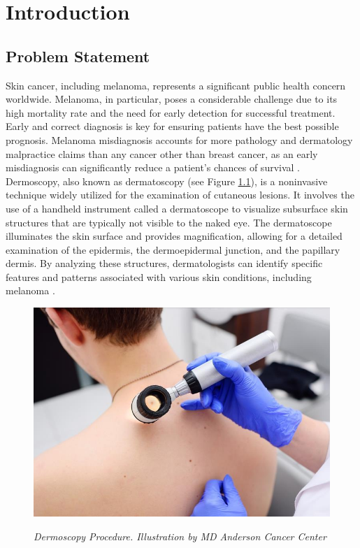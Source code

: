 \chapter{Introduction}
\label{cap:intro}

\section{Problem Statement}

Skin cancer, including melanoma, represents a significant public health concern
worldwide. Melanoma, in particular, poses a considerable challenge due to its
high mortality rate and the need for early detection for successful treatment.
Early and correct diagnosis is key for ensuring patients have the best possible
prognosis. Melanoma misdiagnosis accounts for more pathology and dermatology
malpractice claims than any cancer other than breast cancer, as an early
misdiagnosis can significantly reduce a patient’s chances of survival
\cite{Melanoma}. \\

Dermoscopy, also known as dermatoscopy (see Figure
\ref{fig:procedure_dermoscopy}), is a noninvasive technique widely utilized for
the examination of cutaneous lesions. It involves the use of a handheld
instrument called a dermatoscope to visualize subsurface skin structures that
are typically not visible to the naked eye. The dermatoscope illuminates the
skin surface and provides magnification, allowing for a detailed examination of
the epidermis, the dermoepidermal junction, and the papillary dermis. By
analyzing these structures, dermatologists can identify specific features and
patterns associated with various skin conditions, including melanoma
\cite{Dermoscopy}.

\begin{figure}[htb] \centering
  \includegraphics[width=6.5 cm]{imatges/introduction/medical_procedure_dermastocopy.jpeg}
  \caption[Dermoscopy Procedure]{\textit{Dermoscopy Procedure. Illustration by MD Anderson Cancer Center}}
  {\label{fig:procedure_dermoscopy}}
\end{figure}

